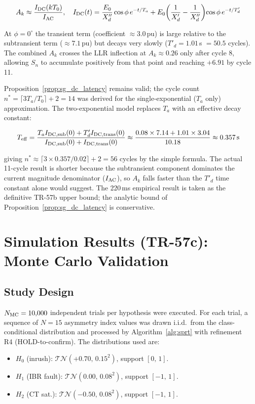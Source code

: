 \documentclass[11pt, a4paper]{article}
\newcommand{\TN}[2]{\mathcal{TN}(#1,\,#2)}
\begin{document}
\begin{equation}
  A_k \approx \frac{I_{\rm DC}(k T_0)}{I_{\rm AC}},
  \quad
  I_{\rm DC}(t) = \frac{E_0}{X''_d}\cos\phi\,e^{-t/T_a}
    + E_0\!\left(\frac{1}{X'_d}-\frac{1}{X''_d}\right)\!\cos\phi\,e^{-t/T'_d}
\end{equation}

At $\phi=0^\circ$ the transient term (coefficient
$\approx 3.0\,$pu) is large relative to the subtransient term
($\approx 7.1\,$pu) but decays very slowly ($T'_d = 1.01\,$s $= 50.5$
cycles).  The combined $A_k$ crosses the LLR inflection at
$A_k \approx 0.26$ only after cycle 8, allowing $S_n$ to accumulate
positively from that point and reaching $+6.91$ by cycle 11.

Proposition~\ref{prop:sg_dc_latency} remains valid; the cycle count
$n^* = \lceil 3T_a/T_0 \rceil + 2 = 14$ was derived for the
single-exponential ($T_a$ only) approximation.  The two-exponential model
replaces $T_a$ with an effective decay constant:

\begin{equation}
  T_{\rm eff} = \frac{T_a I_{\rm DC,sub}(0) + T'_d I_{\rm DC,trans}(0)}
                     {I_{\rm DC,sub}(0) + I_{\rm DC,trans}(0)}
              \approx \frac{0.08 \times 7.14 + 1.01 \times 3.04}{10.18}
              \approx 0.357\,\text{s}
\end{equation}

giving $n^* \approx \lceil 3 \times 0.357 / 0.02 \rceil + 2 = 56$ cycles
by the simple formula.  The actual 11-cycle result is shorter because the
subtransient component dominates the current magnitude denominator
($I_{\rm AC}$), so $A_k$ falls faster than the $T'_d$ time constant alone
would suggest.  The 220\,ms empirical result is taken as the definitive
TR-57b upper bound; the analytic bound of Proposition~\ref{prop:sg_dc_latency}
is conservative.

\section{Simulation Results (TR-57c): Monte Carlo Validation}
\label{sec:tr57c}

\subsection{Study Design}

$N_{\rm MC} = 10{,}000$ independent trials per hypothesis were executed.
For each trial, a sequence of $N = 15$ asymmetry index values was drawn
i.i.d.\ from the class-conditional distribution and processed by
Algorithm~\ref{alg:sprt} with refinement R4 (HOLD-to-confirm).  The
distributions used are:
\begin{itemize}
  \item $H_0$ (inrush): $\TN{+0.70}{0.15^2}$, support $[0,\,1]$.
  \item $H_1$ (IBR fault): $\TN{0.00}{0.08^2}$, support $[-1,\,1]$.
  \item $H_2$ (CT sat.): $\TN{-0.50}{0.08^2}$, support $[-1,\,1]$.
\end{itemize}
\end{document}
